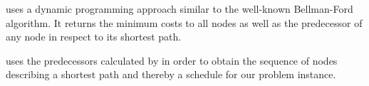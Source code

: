 \documentclass[hidelinks]{article}
\newcommand\Let[2]{\State #1 $\gets$ #2}
\newcommand\Blet[2]{\State \textbf{let} #1 \textbf{be} #2}
\theoremstyle{plain}
\theoremstyle{definition}
\theoremstyle{rem}
\DeclareMathOperator*{\argmin}{arg\,min}
\newcommand{\fromto}[2]{\{#1,\ldots,#2\}}
\begin{document}
 uses a dynamic programming approach similar to the well-known Bellman-Ford algorithm. It returns the minimum costs to all nodes as well as the predecessor of any node in respect to its shortest path.

 uses the predecessors calculated by  in order to obtain the sequence of nodes describing a shortest path and thereby a schedule for our problem instance.
\end{document}

